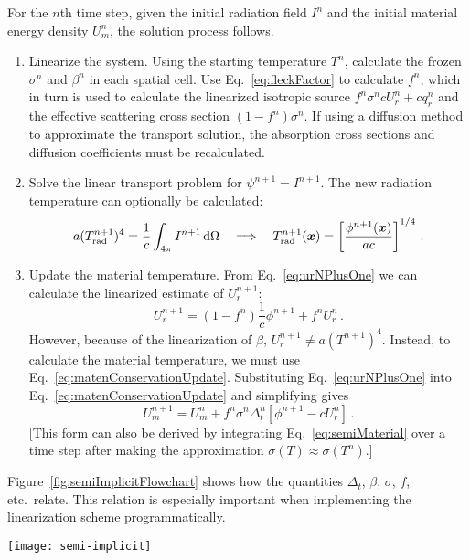 For the $n$th time step, given the initial radiation field $I^{n}$ and the
initial material energy density $U_m^n$, the solution process follows.
\begin{enumerate}
  \item Linearize the system. Using the starting temperature $T^n$, calculate
    the frozen $\sigma^n$ and $\beta^n$ in each spatial cell. Use
    Eq.~\eqref{eq:fleckFactor} to calculate $f^n$, which in turn is used to
    calculate the linearized isotropic source $f^n \sigma^n c U_r^n + c q_r^n$
    and the effective scattering cross section $\left(1 - f^n\right) \sigma^n$.
    If using a diffusion method to approximate the transport solution, the
    absorption cross sections and diffusion coefficients must be recalculated.
  \item Solve the linear transport problem for $\psi^{n+1}=I^{n+1}$. The new
    radiation
    temperature can optionally be calculated:
    \begin{equation*}
      a (T_\text{rad}^{n+1})^4 = \frac{1}{c} \int_{4\pi} I^{n+1}
      \mathop{}\!\mathrm{d} \Omega
      \quad \Longrightarrow \quad
      T_\text{rad}^{n+1}(\bm{x}) = \left[ \frac{\phi^{n+1}(\bm{x})}{ac} \right]^{1/4}\,.
    \end{equation*}
  \item Update the material temperature. From Eq.~\eqref{eq:urNPlusOne}
    we can calculate the linearized estimate of $U_r^{n+1}$:
    \begin{equation*}
      U_r^{n+1} = \left(1 - f^n\right) \frac1c \phi^{n+1}  + f^n U_r^n\,.
    \end{equation*}
    However, because of the linearization of $\beta$, $U_r^{n+1} \ne a
    (T^{n+1})^4$. Instead, to calculate the material temperature, we must use
    Eq.~\eqref{eq:matenConservationUpdate}. Substituting
    Eq.~\eqref{eq:urNPlusOne} into Eq.~\eqref{eq:matenConservationUpdate}
    and simplifying gives
    \begin{equation}\label{eq:matenConservationUpdate2}
      U_m^{n+1} =  U_m^n + f^n \sigma^n \Delta_t^n \left[ \phi^{n+1} - c U_r^n \right] \,.
    \end{equation}
    [This form can also be derived by integrating
    Eq.~\eqref{eq:semiMaterial} over a time step after making the
    approximation $\sigma(T) \approx \sigma(T^n)$.]
\end{enumerate}

Figure~\ref{fig:semiImplicitFlowchart} shows how the quantities $\Delta_t$,
$\beta$, $\sigma$, $f$, etc.~relate. This relation is especially important when
implementing the linearization scheme programmatically. 
\begin{sidewaysfigure}[hp]
  \centering
  \texttt{[image: semi-implicit]}
  \caption{Dependency graph of quantities in the semi-implicit discretization.}
  \label{fig:semiImplicitFlowchart}
\end{sidewaysfigure}


